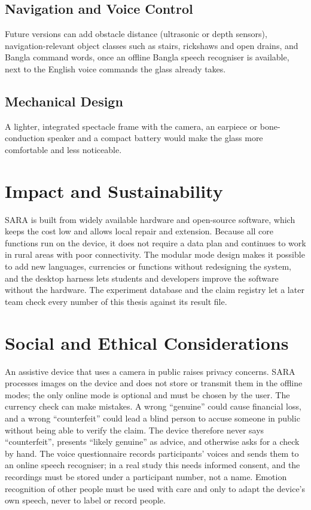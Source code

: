 \subsection{Navigation and Voice Control}
Future versions can add obstacle distance (ultrasonic or depth sensors), navigation-relevant object classes such as stairs, rickshaws and open drains, and Bangla command words, once an offline Bangla speech recogniser is available, next to the English voice commands the glass already takes.

\subsection{Mechanical Design}
A lighter, integrated spectacle frame with the camera, an earpiece or bone-conduction speaker and a compact battery would make the glass more comfortable and less noticeable.

\section{Impact and Sustainability}
SARA is built from widely available hardware and open-source software, which keeps the cost low and allows local repair and extension. Because all core functions run on the device, it does not require a data plan and continues to work in rural areas with poor connectivity. The modular mode design makes it possible to add new languages, currencies or functions without redesigning the system, and the desktop harness lets students and developers improve the software without the hardware. The experiment database and the claim registry let a later team check every number of this thesis against its result file.

\section{Social and Ethical Considerations}
An assistive device that uses a camera in public raises privacy concerns. SARA processes images on the device and does not store or transmit them in the offline modes; the only online mode is optional and must be chosen by the user. The currency check can make mistakes. A wrong ``genuine'' could cause financial loss, and a wrong ``counterfeit'' could lead a blind person to accuse someone in public without being able to verify the claim. The device therefore never says ``counterfeit'', presents ``likely genuine'' as advice, and otherwise asks for a check by hand. The voice questionnaire records participants' voices and sends them to an online speech recogniser; in a real study this needs informed consent, and the recordings must be stored under a participant number, not a name. Emotion recognition of other people must be used with care and only to adapt the device's own speech, never to label or record people.

